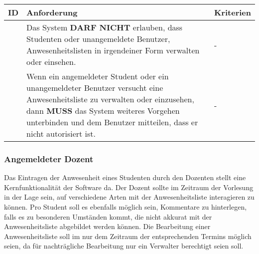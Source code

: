 \begin{tabular} {|p{}|p{}|p{}|}
	\hline
	ID & Anforderung & Kriterien \\
	\hline
	\printfreqnr
	& Das System \textbf{DARF NICHT} erlauben, dass Studenten oder unangemeldete Benutzer, Anwesenheitslisten in irgendeiner Form verwalten oder einsehen. 
	& - \\
	\hline
	\printfreqnr
	& Wenn ein angemeldeter Student oder ein unangemeldeter Benutzer versucht eine Anwesenheitsliste zu verwalten oder einzusehen, dann \textbf{MUSS} das System weiteres Vorgehen unterbinden und dem Benutzer mitteilen, dass er nicht autorisiert ist.
	& - \\ 
	\hline
\end{tabular}

\newpage

\subsubsection{Angemeldeter Dozent}
Das Eintragen der Anwesenheit eines Studenten durch den Dozenten stellt eine Kernfunktionalität der Software da. Der Dozent sollte im Zeitraum der Vorlesung in der Lage sein, auf verschiedene Arten mit der Anwesenheitsliste interagieren zu können. Pro Student soll es ebenfalls möglich sein, Kommentare zu hinterlegen, falls es zu besonderen Umständen kommt, die nicht akkurat mit der Anwesenheitsliste abgebildet werden können. Die Bearbeitung einer Anwesenheitsliste soll im nur dem Zeitraum der entsprechenden Termins möglich seien, da für nachträgliche Bearbeitung nur ein Verwalter berechtigt seien soll.
\vspace{12pt}

